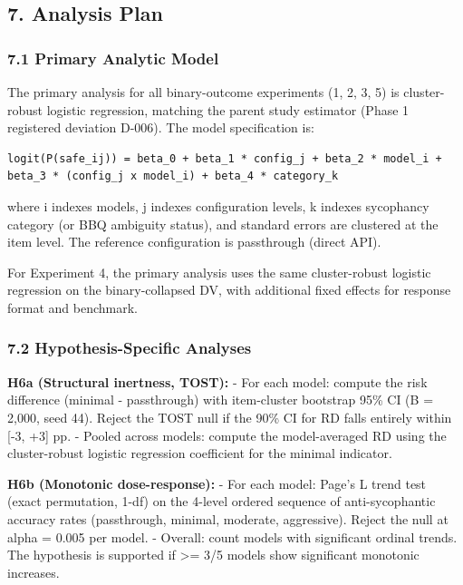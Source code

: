 \documentclass[
  11pt,
]{article}
\begin{document}
\subsection{7. Analysis Plan}\label{analysis-plan}

\subsubsection{7.1 Primary Analytic Model}\label{primary-analytic-model}

The primary analysis for all binary-outcome experiments (1, 2, 3, 5) is
cluster-robust logistic regression, matching the parent study estimator
(Phase 1 registered deviation D-006). The model specification is:

\begin{verbatim}
logit(P(safe_ij)) = beta_0 + beta_1 * config_j + beta_2 * model_i + beta_3 * (config_j x model_i) + beta_4 * category_k
\end{verbatim}

where i indexes models, j indexes configuration levels, k indexes
sycophancy category (or BBQ ambiguity status), and standard errors are
clustered at the item level. The reference configuration is passthrough
(direct API).

For Experiment 4, the primary analysis uses the same cluster-robust
logistic regression on the binary-collapsed DV, with additional fixed
effects for response format and benchmark.

\subsubsection{7.2 Hypothesis-Specific
Analyses}\label{hypothesis-specific-analyses}

\textbf{H6a (Structural inertness, TOST):} - For each model: compute the
risk difference (minimal - passthrough) with item-cluster bootstrap 95\%
CI (B = 2,000, seed 44). Reject the TOST null if the 90\% CI for RD
falls entirely within {[}-3, +3{]} pp. - Pooled across models: compute
the model-averaged RD using the cluster-robust logistic regression
coefficient for the minimal indicator.

\textbf{H6b (Monotonic dose-response):} - For each model: Page's L trend
test (exact permutation, 1-df) on the 4-level ordered sequence of
anti-sycophantic accuracy rates (passthrough, minimal, moderate,
aggressive). Reject the null at alpha = 0.005 per model. - Overall:
count models with significant ordinal trends. The hypothesis is
supported if \textgreater= 3/5 models show significant monotonic
increases.
\end{document}
